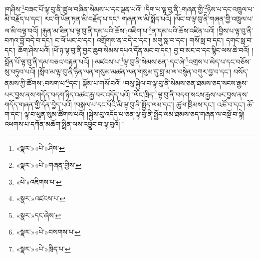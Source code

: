 །གཤིས་\footnote{«སྣར་»«པེ་»ཤིས་}བཟང་པོ་ལྟ་བུ་ནི་ཚུལ་བཞིན་སེམས་པ་དང་ལྡན་པའོ། །དིག་པ་ལྟ་བུ་ནི་:གཞན་གྱི་\footnote{«སྣར་»«པེ་»གཞན་གྱིས་}ཉེས་པ་དང་འཁྲུལ་པ་མི་བརྗོད་པ་དང་། རང་གི་ཡོན་ཏན་མི་བརྗོད་པ་དང་། གཞན་ལ་མི་སྨོད་པའོ། །ལོང་བ་ལྟ་བུ་ནི་གཞན་གྱི་འཁྲུལ་པ་ལ་མི་བལྟ་བའོ། །རྐུན་མ་ཟིན་པ་ལྟ་བུ་ནི་དམ་པའི་ཆོས་:འཇིག་པ་\footnote{«པེ་»འཇིགས་པ་}ན་དམ་པའི་ཆོས་འཛིན་པའོ། །བྱིས་པ་ལྟ་བུ་ནི་བཀའ་བློ་བདེ་བ་དང་། ང་ལོ་ཡང་བ་དང་། འགྲོགས་ན་བདེ་བ་དང་། མགུ་སླ་བ་དང་། གསོ་སླ་བ་དང་། དགང་སླ་བ་དང་། ཆོག་ཤེས་པའོ། །ཕོ་ཉ་ལྟ་བུ་ནི་བྱང་ཆུབ་སེམས་དཔའ་དོན་མང་བ་དང་། བྱ་བ་མང་བ་དང་སྙིང་ལས་ཆེ་བའོ། །བློན་པོ་ལྟ་བུ་ནི་དམ་བཅའ་བརྟན་པའོ། །:མཛངས་པ་\footnote{«སྣར་»འཛངས་པ་}ལྟ་བུ་ནི་སེམས་ཅན་:དང་ཞེ་\footnote{«སྣར་»དང་ཞེས་}འགྲས་པ་མེད་པ་དང་བཅོས་སུ་བཏུབ་པའོ། །སློབ་མ་ལྟ་བུ་ནི་ཉིན་ལན་གསུམ་མཚན་ལན་གསུམ་དུ་བླ་མ་ལ་བསྙེན་བཀུར་བྱ་བ་དང་། བསོད་ནམས་ཀྱི་ཚོགས་:བསག་པ་\footnote{«སྣར་»«པེ་»བསགས་པ་}དང་། སྡོམ་པ་གསོ་བའོ། །བསུ་སྐྱེལ་བ་ལྟ་བུ་ནི་སེམས་ཅན་ཐམས་ཅད་སངས་རྒྱས་པར་བྱས་ནས་གདོད་བདག་ཉིད་འཚང་རྒྱ་བར་འདོད་པའོ། །ལོང་ཁྲིད་\footnote{«སྣར་»«པེ་»ཁྲིད་པ་}ལྟ་བུ་ནི་བདག་སངས་རྒྱས་པར་བྱས་ནས་གདོད་གཞན་གྱི་དོན་བྱེད་པའོ། །བསྐལ་པ་དང་པོའི་མི་ལྟ་བུ་ནི་སྤྱོད་ལམ་དང་། ཚུལ་ཁྲིམས་དང་། འཚོ་བ་དང་། ཆོ་ག་དང་། ལྟ་བ་ཕུན་སུམ་ཚོགས་པའོ། །སྐྱེས་བུ་འདོད་པ་ཅན་ལྟ་བུ་ནི་སྤྱོད་ལམ་ཐམས་ཅད་གཞན་ལ་བསྔོ་བ་སྟེ། འཕགས་པ་དཀོན་མཆོག་སྤྲིན་ལས་འབྱུང་བ་ལྟ་བུའོ། །
